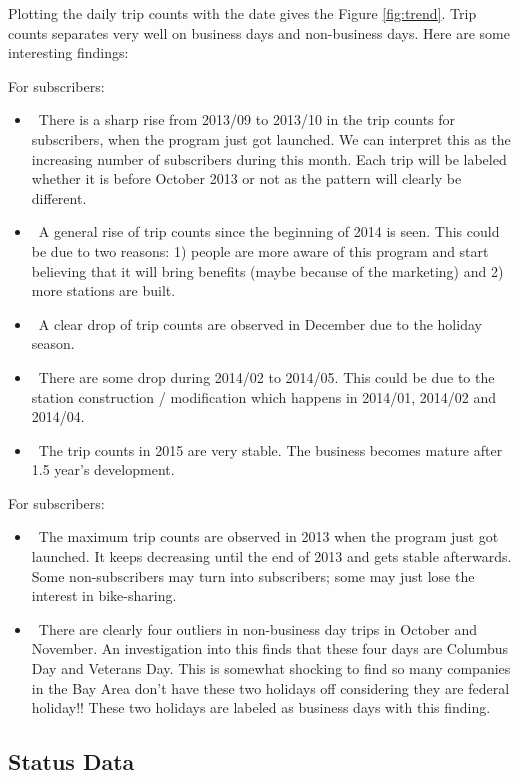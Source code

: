 \documentclass[a4paper]{article}
\begin{document}
			Plotting the daily trip counts with the date gives the Figure \ref{fig:trend}. Trip counts separates very well on business days and non-business days. Here are some interesting findings:
			
			For subscribers:
			
			\begin{itemize}
				\item \ There is a sharp rise from 2013/09 to 2013/10 in the trip counts for subscribers, when the program just got launched. We can interpret this as the increasing number of subscribers during this month. Each trip will be labeled whether it is before October 2013 or not as the pattern will clearly be different.
				\item \ A general rise of trip counts since the beginning of 2014 is seen. This could be due to two reasons: 1) people are more aware of this program and start believing that it will bring benefits (maybe because of the marketing) and 2) more stations are built.
				\item \ A clear drop of trip counts are observed in December due to the holiday season.
				\item \ There are some drop during 2014/02 to 2014/05. This could be due to the station construction / modification which happens in 2014/01, 2014/02 and 2014/04.
				\item \ The trip counts in 2015 are very stable. The business becomes mature after 1.5 year's development.
			\end{itemize}   
			
			For subscribers: 			
			
			\begin{itemize}
				\item \ The maximum trip counts are observed in 2013 when the program just got launched. It keeps decreasing until the end of 2013 and gets stable afterwards. Some non-subscribers may turn into subscribers; some may just lose the interest in bike-sharing.
				\item \ There are clearly four outliers in non-business day trips in October and November. An investigation into this finds that these four days are Columbus Day and Veterans Day. This is somewhat shocking to find so many companies in the Bay Area don't have these two holidays off considering they are federal holiday!! These two holidays are labeled as business days with this finding.
			\end{itemize}	

			
		\subsection{Status Data}
\end{document}
